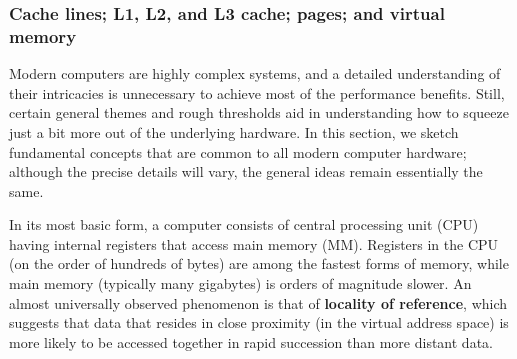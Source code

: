 \subsubsection[Cache lines; L1, L2, and L3 cache; pages; and virtual memory]{Cache lines; L1, L2, and L3 cache; pages; and virtual memory}\label{cache-lines,-l1,-l2,-and-l3-cache,-pages,-and-virtual-memory}

Modern computers are highly complex systems, and a detailed
understanding of their intricacies is unnecessary to achieve most of
the performance benefits. Still, certain general themes and
rough thresholds aid in understanding how to squeeze just a bit
more out of the underlying hardware. In this section, we sketch
fundamental concepts that are common to all modern computer hardware;
although the precise details will vary, the general ideas remain
essentially the same.

In its most basic form, a computer consists of central processing unit
(CPU) having internal registers that access main memory (MM).
Registers in the CPU (on the order of hundreds of bytes) are among the
fastest forms of memory, while main memory (typically many gigabytes) is
orders of magnitude slower. An almost universally observed phenomenon is
that of \textbf{locality of reference}, which suggests that data that
resides in close proximity (in the virtual address space) is more likely
to be accessed together in rapid succession than more distant data.

